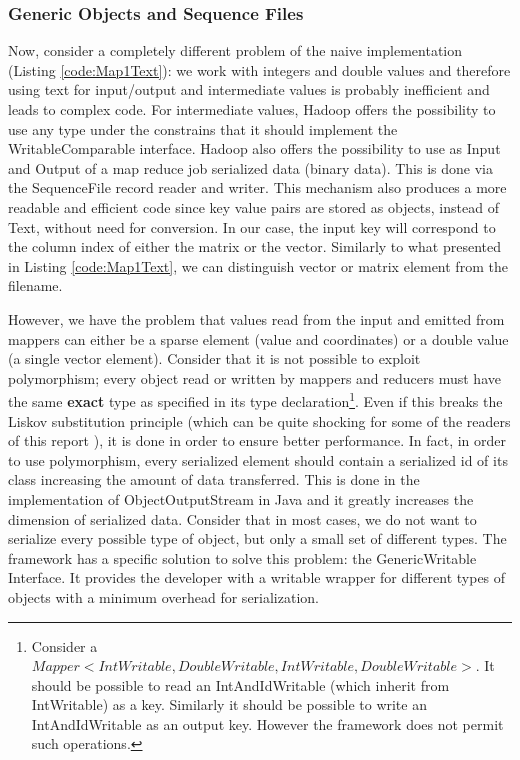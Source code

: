 \documentclass[a4paper,12pt]{article}
\begin{document}
\subsubsection{Generic Objects and Sequence Files}

Now, consider a completely different problem of the naive implementation (Listing \ref{code:Map1Text}): we work with integers and double values and therefore using text for input/output and intermediate values is probably inefficient and leads to complex code.
For intermediate values, Hadoop offers the possibility to use any type under the constrains that it should implement the WritableComparable interface.
Hadoop also offers the possibility to use as Input and Output of a map reduce job serialized data (binary data). 
This is done via the SequenceFile record reader and writer.
This mechanism also produces a more readable and efficient code since key value pairs are stored as objects, instead of Text, without need for conversion. 
In our case, the input key will correspond to the column index of either the matrix or the vector.
Similarly to what presented in Listing \ref{code:Map1Text}, we can distinguish vector or matrix element from the filename.

However, we have the problem that values read from the input and emitted from mappers can either be a sparse element (value and coordinates) or a double value (a single vector element).
Consider that it is not possible to exploit polymorphism; every object read or written by mappers and reducers must have the same \textbf{exact} type as specified in its type declaration\footnote{Consider a $Mapper<IntWritable,DoubleWritable,IntWritable,DoubleWritable>$. It should be possible to read an IntAndIdWritable (which inherit from IntWritable) as a key. Similarly it should be possible to write an IntAndIdWritable as an output key. However the framework does not permit such operations.}.
Even if this breaks the Liskov substitution principle (which can be quite shocking for some of the readers of this report ), it is done in order to ensure better performance.
In fact, in order to use polymorphism, every serialized element should contain a serialized id of its class increasing the amount of data transferred.
This is done in the implementation of ObjectOutputStream in Java and it greatly increases the dimension of serialized data.
Consider that in most cases, we do not want to serialize every possible type of object, but only a small set of different types.
The framework has a specific solution to solve this problem: the GenericWritable Interface. 
It provides the developer with a writable wrapper for different types of objects with a minimum overhead for serialization.
\end{document}
